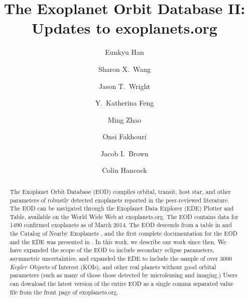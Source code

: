 \documentclass[11pt,preprint]{aastex}
\def\kepler{\textit{Kepler}}
\begin{document}
\begin{CJK*}{UTF8}{gbsn}

\title{The Exoplanet Orbit Database \textsc{II}: Updates to
  exoplanets.org}

\author{Eunkyu Han}
\author{Sharon X.\ Wang}
\author{Jason T.\ Wright}
\author{Y.\ Katherina Feng}
\author{Ming Zhao}
\author{Onsi Fakhouri}
\author{Jacob I.\ Brown}
\author{Colin Hancock}


\begin{abstract}

The Exoplanet Orbit Database (EOD) compiles orbital, transit, host star, and other
parameters of robustly detected exoplanets reported in the peer-reviewed
literature. The EOD can be navigated through the Exoplanet Data
Explorer (EDE) Plotter and Table, available on the World Wide Web at exoplanets.org. The EOD contains data for 1490 confirmed exoplanets as of March 2014.  
The EOD descends from a table in \citet{Butler2002} and the Catalog of Nearby Exoplanets \citep{Butler2006}, and the first complete documentation for the EOD and the EDE was presented in 
\cite{Wright2011}. In this work, we describe our work since then.  We have expanded the scope of the
EOD to include secondary eclipse parameters, asymmetric uncertainties,
and expanded the EDE to include
the sample of over 3000 \kepler\ Objects of Interest (KOIs), and other
real planets without good orbital parameters (such as many of those
those detected by microlensing and imaging.) Users can download the
latest version of the entire EOD as a single comma separated value
file from the front page of exoplanets.org.  

\end{abstract}  


\end{CJK*}
\end{document}
